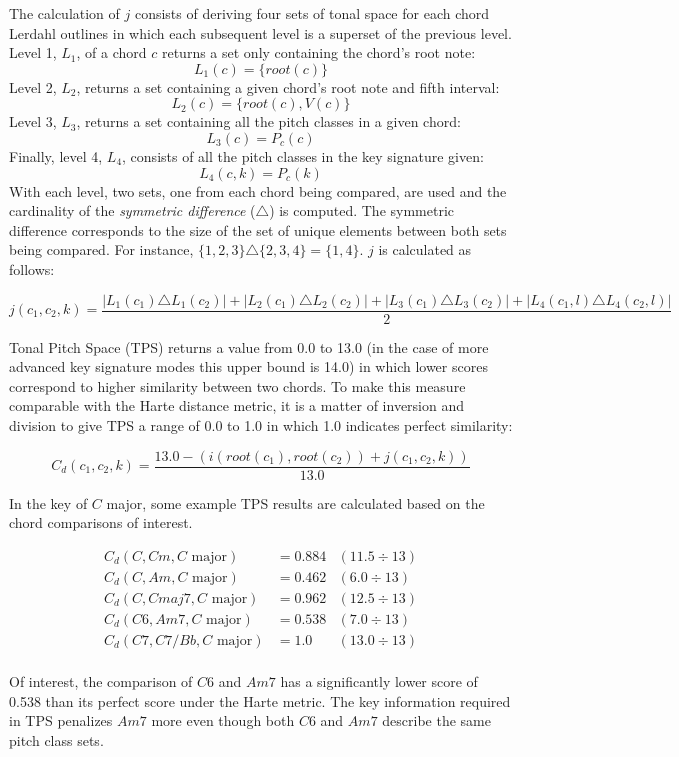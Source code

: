 The calculation of $j$ consists of deriving four sets of tonal space for each chord Lerdahl outlines in which each subsequent level is a superset of the previous level. Level 1, $L_1$, of a chord $c$ returns a set only containing the chord's root note: \[L_1(c) = \{root(c)\}\] Level 2, $L_2$, returns a set containing a given chord's root note and fifth interval: \[L_2(c) = \{root(c), V(c)\}\] Level 3, $L_3$, returns a set containing all the pitch classes in a given chord: \[L_3(c) = P_c(c)\] Finally, level 4, $L_4$, consists of all the pitch classes in the key signature given: \[L_4(c,k) = P_c(k)\] With each level, two sets, one from each chord being compared, are used and the cardinality of the \textit{symmetric difference} ($\triangle$) is computed. The symmetric difference corresponds to the size of the set of unique elements between both sets being compared. For instance, $\{1,2,3\} \triangle \{2,3,4\} = \{1,4\}$. $j$ is calculated as follows:

\[ j(c_1,c_2,k) = \frac{|L_1(c_1) \triangle L_1(c_2)| + |L_2(c_1) \triangle L_2(c_2)| + |L_3(c_1) \triangle L_3(c_2)| + |L_4(c_1,l) \triangle L_4(c_2,l)|}{2} \]

Tonal Pitch Space (TPS) returns a value from 0.0 to 13.0 (in the case of more advanced key signature modes this upper bound is 14.0) in which lower scores correspond to higher similarity between two chords. To make this measure comparable with the Harte distance metric, it is a matter of inversion and division to give TPS a range of 0.0 to 1.0 in which 1.0 indicates perfect similarity:

\[ C_d(c_1, c_2, k) = \frac{13.0 - (i(root(c_1), root(c_2)) + j(c_1, c_2, k))}{13.0} \]

In the key of $C$ major, some example TPS results are calculated based on the chord comparisons of interest.

\begin{align*}
C_d(C,Cm,C\text{ major}) &= 0.884 &(11.5 \div 13) \\
C_d(C,Am,C\text{ major}) &= 0.462 &(6.0 \div 13) \\
C_d(C,Cmaj7,C\text{ major}) &= 0.962 &(12.5 \div 13) \\
C_d(C6, Am7,C\text{ major}) &= 0.538 &(7.0 \div 13) \\
C_d(C7, C7/Bb,C\text{ major}) &= 1.0 &(13.0 \div 13) \\
\end{align*}

Of interest, the comparison of $C6$ and $Am7$ has a significantly lower score of 0.538 than its perfect score under the Harte metric. The key information required in TPS penalizes $Am7$ more even though both $C6$ and $Am7$ describe the same pitch class sets.

